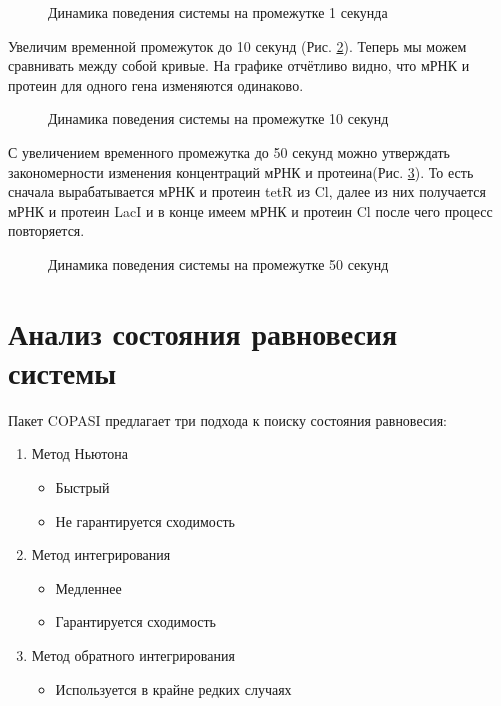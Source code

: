 \begin{figure}[!h]
\caption{Динамика поведения системы на промежутке 1 секунда}
\label{ris:plot1}
\end{figure}

Увеличим временной промежуток до 10 секунд (Рис. \ref{ris:plot2}). Теперь мы можем сравнивать между собой кривые. На графике отчётливо видно,
что мРНК и протеин для одного гена изменяются одинаково.

\begin{figure}[!h]
\caption{Динамика поведения системы на промежутке 10 секунд}
\label{ris:plot2}
\end{figure}

С увеличением временного промежутка до 50 секунд можно утверждать закономерности изменения концентраций мРНК и протеина(Рис. \ref{ris:plot3}).
То есть сначала вырабатывается мРНК и протеин tetR из Cl, далее из них получается мРНК и протеин LacI и в конце имеем мРНК и протеин Cl
после чего процесс повторяется.

\begin{figure}[!h]
\caption{Динамика поведения системы на промежутке 50 секунд}
\label{ris:plot3}
\end{figure}

\newpage
\section{Анализ состояния равновесия системы}
Пакет COPASI предлагает три подхода к поиску состояния равновесия:
\begin{enumerate}
  \item Метод Ньютона
  \begin{itemize}
    \item Быстрый
    \item Не гарантируется сходимость
  \end{itemize}
  \item Метод интегрирования
  \begin{itemize}
    \item Медленнее
    \item Гарантируется сходимость
  \end{itemize}
  \item Метод обратного интегрирования
  \begin{itemize}
    \item Используется в крайне редких случаях
  \end{itemize}
\end{enumerate}

